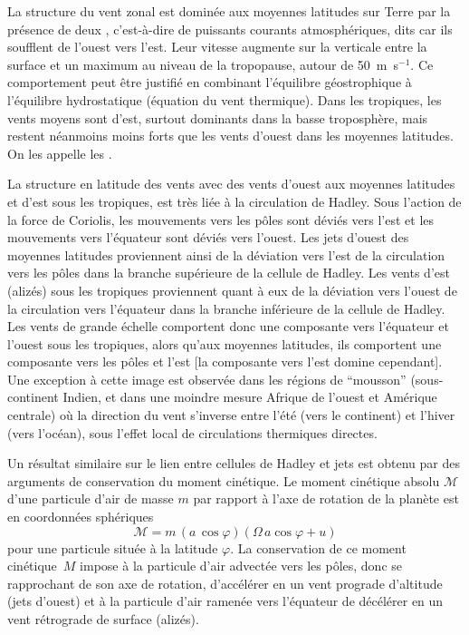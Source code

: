 \sk
La structure du vent zonal est dominée aux moyennes latitudes sur Terre par la présence de deux , c'est-à-dire de puissants courants atmosphériques, dits  car ils soufflent de l'ouest vers l'est. Leur vitesse augmente sur la verticale entre la surface et un maximum au niveau de la tropopause, autour de 50~m~s$^{-1}$. Ce comportement peut être justifié en combinant l'équilibre géostrophique à l'équilibre hydrostatique (équation du vent thermique). Dans les tropiques, les vents moyens sont d'est, surtout dominants dans la basse troposphère, mais restent néanmoins moins forts que les vents d'ouest dans les moyennes latitudes. On les appelle les .

\sk
La structure en latitude des vents %
avec des vents d'ouest aux moyennes latitudes et d'est sous les tropiques, est très liée à la circulation de Hadley.
Sous l'action de la force de Coriolis, les mouvements vers les pôles sont déviés vers l'est et les mouvements vers l'équateur sont déviés vers l'ouest. Les jets d'ouest des moyennes latitudes proviennent ainsi de la déviation vers l'est de la circulation vers les pôles dans la branche supérieure de la cellule de Hadley. Les vents d'est (alizés) sous les tropiques proviennent quant à eux de la déviation vers l'ouest de la circulation vers l'équateur dans la branche inférieure de la cellule de Hadley. Les vents de grande échelle comportent donc une composante vers l'équateur et l'ouest sous les tropiques, alors qu'aux moyennes latitudes, ils comportent une composante vers les pôles et l'est [la composante vers l'est domine cependant]. Une exception à cette image est observée dans les régions de ``mousson'' (sous-continent Indien, et dans une moindre mesure Afrique de l'ouest et Amérique centrale) où la direction du vent s'inverse entre l'été (vers le continent) et l'hiver (vers l'océan), sous l'effet local de circulations thermiques directes.

\sk
Un résultat similaire sur le lien entre cellules de Hadley et jets est obtenu par des arguments de conservation du moment cinétique. Le moment cinétique absolu $\mathcal{M}$ d'une particule d'air de masse $m$ par rapport à l'axe de rotation de la planète est en coordonnées sphériques
%
\[
\mathcal{M} = m \, (a \, \cos \varphi) (\Omega \, a \cos \varphi + u)
\]
%
\noindent pour une particule située à la latitude $\varphi$. 
%
\noindent La conservation de ce moment cinétique~$M$ impose à la particule d'air advectée vers les pôles, donc se rapprochant de son axe de rotation,
d'accélérer en un vent prograde d'altitude (jets d'ouest) et à la particule d'air ramenée vers l'équateur de décélérer en un vent rétrograde de surface (alizés).

